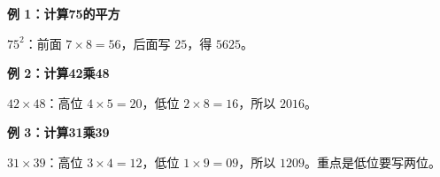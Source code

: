 \clearpage
\begin{examplebox}
\textbf{\textcolor{CExample}{例 1：计算75的平方}}
\par\medskip
\begin{center}

\end{center}
\medskip
$75^2$：前面 $7\times8=56$，后面写 $25$，得 $\boxed{5625}$。
\end{examplebox}
\clearpage
\begin{examplebox}
\textbf{\textcolor{CExample}{例 2：计算42乘48}}
\par\medskip
\begin{center}

\end{center}
\medskip
$42\times48$：高位 $4\times5=20$，低位 $2\times8=16$，所以 $\boxed{2016}$。
\end{examplebox}
\clearpage
\begin{examplebox}
\textbf{\textcolor{CExample}{例 3：计算31乘39}}
\par\medskip
\begin{center}

\end{center}
\medskip
$31\times39$：高位 $3\times4=12$，低位 $1\times9=09$，所以 $\boxed{1209}$。重点是低位要写两位。
\end{examplebox}
